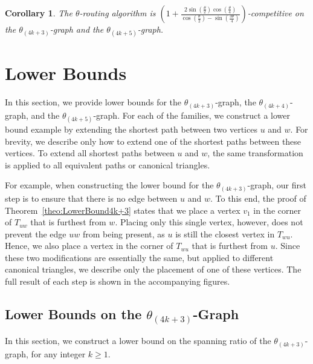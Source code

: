 \documentclass[12pt]{article}
\newtheorem{coro}[defin]{Corollary}
\newenvironment{corollary}{\begin{coro} \sl}{\end{coro}}
\newcommand{\Graph}[1]{\ensuremath{\theta_{(4 k + #1)}}-Graph\xspace}
\newcommand{\graph}[1]{\ensuremath{\theta_{(4 k + #1)}}-graph\xspace}
\newcommand{\canon}[2]{\ensuremath{T_{#1 #2}}}
\begin{document}
\begin{corollary}
  \label{cor:Routing4k+3,5}
  The $\theta$-routing algorithm is $\left( 1 + \frac{2 \sin \left(\frac{\theta}{2}\right) \cos \left(\frac{\theta}{4}\right)}{\cos \left(\frac{\theta}{2}\right) - \sin \left(\frac{3\theta}{4}\right)} \right)$-competitive on the \graph{3} and the \graph{5}. 
\end{corollary}


\section{Lower Bounds}
\label{sec:LowerBounds}
In this section, we provide lower bounds for the \graph{3}, the \graph{4}, and the \graph{5}. For each of the families, we construct a lower bound example by extending the shortest path between two vertices $u$ and $w$. For brevity, we describe only how to extend one of the shortest paths between these vertices. To extend all shortest paths between $u$ and $w$, the same transformation is applied to all equivalent paths or canonical triangles. 

For example, when constructing the lower bound for the \graph{3}, our first step is to ensure that there is no edge between $u$ and $w$. To this end, the proof of Theorem~\ref{theo:LowerBound4k+3} states that we place a vertex $v_1$ in the corner of \canon{u}{w} that is furthest from $w$. Placing only this single vertex, however, does not prevent the edge $u w$ from being present, as $u$ is still the closest vertex in \canon{w}{u}. Hence, we also place a vertex in the corner of \canon{w}{u} that is furthest from $u$. Since these two modifications are essentially the same, but applied to different canonical triangles, we describe only the placement of one of these vertices. The full result of each step is shown in the accompanying figures. 


\subsection{Lower Bounds on the \Graph{3}}
In this section, we construct a lower bound on the spanning ratio of the \graph{3}, for any integer $k \geq 1$. 
\end{document}
